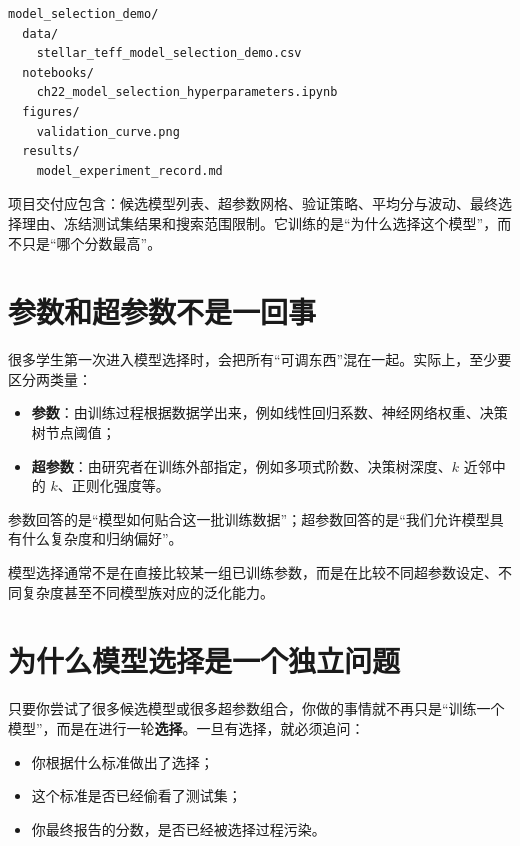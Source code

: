 \begin{examplebox}[最小模型选择项目结构]
\begin{lstlisting}[style=terminal]
model_selection_demo/
  data/
    stellar_teff_model_selection_demo.csv
  notebooks/
    ch22_model_selection_hyperparameters.ipynb
  figures/
    validation_curve.png
  results/
    model_experiment_record.md
\end{lstlisting}
\end{examplebox}

项目交付应包含：候选模型列表、超参数网格、验证策略、平均分与波动、最终选择理由、冻结测试集结果和搜索范围限制。它训练的是“为什么选择这个模型”，而不只是“哪个分数最高”。

\section{参数和超参数不是一回事}

很多学生第一次进入模型选择时，会把所有“可调东西”混在一起。实际上，至少要区分两类量：

\begin{itemize}
    \item \textbf{参数}：由训练过程根据数据学出来，例如线性回归系数、神经网络权重、决策树节点阈值；
    \item \textbf{超参数}：由研究者在训练外部指定，例如多项式阶数、决策树深度、$k$ 近邻中的 $k$、正则化强度等。
\end{itemize}

参数回答的是“模型如何贴合这一批训练数据”；超参数回答的是“我们允许模型具有什么复杂度和归纳偏好”。

\begin{defbox}[模型选择的核心对象]
模型选择通常不是在直接比较某一组已训练参数，而是在比较不同超参数设定、不同复杂度甚至不同模型族对应的泛化能力。
\end{defbox}

\section{为什么模型选择是一个独立问题}

只要你尝试了很多候选模型或很多超参数组合，你做的事情就不再只是“训练一个模型”，而是在进行一轮\textbf{选择}。一旦有选择，就必须追问：

\begin{itemize}
    \item 你根据什么标准做出了选择；
    \item 这个标准是否已经偷看了测试集；
    \item 你最终报告的分数，是否已经被选择过程污染。
\end{itemize}

